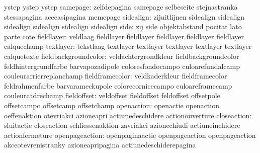                            ystep                     ystep
                           ystep
                 samepage: zelfdepagina              samepage
                           selbeseite                stejnastranka
                           stessapagina              aceeasipagina
                           memepage
                sidealign: zijuitlijnen              sidealign
                           sidealign                 sidealign
                           sidealign                 sidealign
                           sidealign
                     side: zij                       side
                           objektabstand             pocitat
                           lato                      parte
                           cote
               fieldlayer: veldlaag                  fieldlayer
                           fieldlayer                fieldlayer
                           fieldlayer                fieldlayer
                           calquechamp
                textlayer: tekstlaag                 textlayer
                           textlayer                 textlayer
                           textlayer                 textlayer
                           calquetexte
     fieldbackgroundcolor: veldachtergrondkleur      fieldbackgroundcolor
                           feldhintergrundfarbe      barvapozadipole
                           coloresfondocampo         culoarefundalcamp
                           couleurarrierreplanchamp
          fieldframecolor: veldkaderkleur            fieldframecolor
                           feldrahmenfarbe           barvarameckupole
                           colorecornicecampo        culoareframecamp
                           couleurcadrechamp
              fieldoffset: veldoffset                fieldoffset
                           feldoffset                offsetpole
                           offsetcampo               offsetcamp
                           offsetchamp
               openaction: openactie                 openaction
                           oeffenaktion              otevriakci
                           azioneapri                actiunedeschidere
                           actionouverture
              closeaction: sluitactie                closeaction
                           schliessenaktion          zavriakci
                           azionechiudi              actiuneinchidere
                           actionfermeture
           openpageaction: openpaginaactie           openpageaction
                           openpageaction            akceotevrenistranky
                           azioneapripagina          actiunedeschiderepagina
